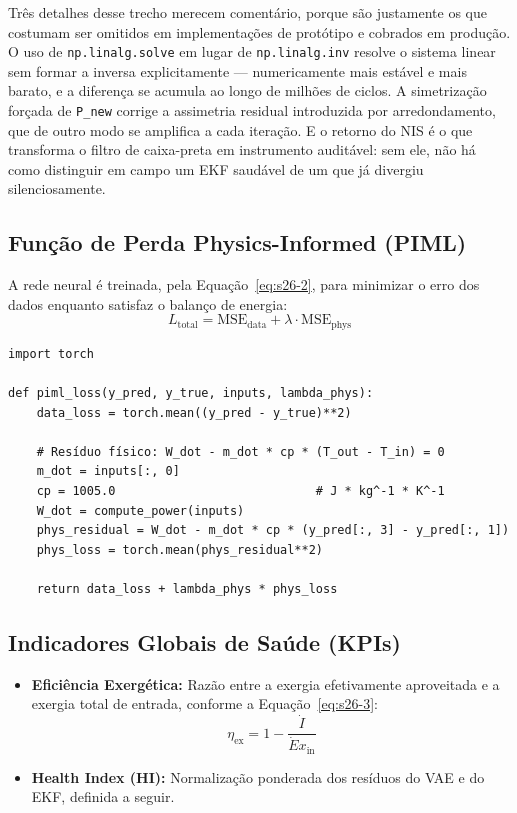 \documentclass[12pt,a4paper]{article}
\numberwithin{equation}{section}
\numberwithin{table}{section}
\numberwithin{figure}{section}
\begin{document}
	Três detalhes desse trecho merecem comentário, porque são justamente os que costumam ser omitidos em implementações de protótipo e cobrados em produção. O uso de \texttt{np.linalg.solve} em lugar de \texttt{np.linalg.inv} resolve o sistema linear sem formar a inversa explicitamente — numericamente mais estável e mais barato, e a diferença se acumula ao longo de milhões de ciclos. A simetrização forçada de \texttt{P\_new} corrige a assimetria residual introduzida por arredondamento, que de outro modo se amplifica a cada iteração. E o retorno do NIS é o que transforma o filtro de caixa-preta em instrumento auditável: sem ele, não há como distinguir em campo um EKF saudável de um que já divergiu silenciosamente.
	
	\subsection{Função de Perda Physics-Informed (PIML)}
	A rede neural é treinada, pela Equação~\eqref{eq:s26-2}, para minimizar o erro dos dados enquanto satisfaz o balanço de energia:
	\begin{equation}\label{eq:s26-2}
 L_{\text{total}} = \text{MSE}_{\text{data}} + \lambda \cdotp \text{MSE}_{\text{phys}} 
\end{equation}
	\begin{verbatim}
import torch

def piml_loss(y_pred, y_true, inputs, lambda_phys):
    data_loss = torch.mean((y_pred - y_true)**2)

    # Resíduo físico: W_dot - m_dot * cp * (T_out - T_in) = 0
    m_dot = inputs[:, 0]
    cp = 1005.0                            # J * kg^-1 * K^-1
    W_dot = compute_power(inputs)
    phys_residual = W_dot - m_dot * cp * (y_pred[:, 3] - y_pred[:, 1])
    phys_loss = torch.mean(phys_residual**2)

    return data_loss + lambda_phys * phys_loss
\end{verbatim}
	
	\subsection{Indicadores Globais de Saúde (KPIs)}
	\begin{itemize}
		\item \textbf{Eficiência Exergética:} Razão entre a exergia efetivamente aproveitada e a exergia total de entrada, conforme a Equação~\eqref{eq:s26-3}:
		\begin{equation}\label{eq:s26-3}
 \eta_{\text{ex}} = 1 - \frac{\dot{I}}{\dot{E}x_{\text{in}}}
\end{equation}
		\item \textbf{Health Index (HI):} Normalização ponderada dos resíduos do VAE e do EKF, definida a seguir.
	\end{itemize}
\end{document}
